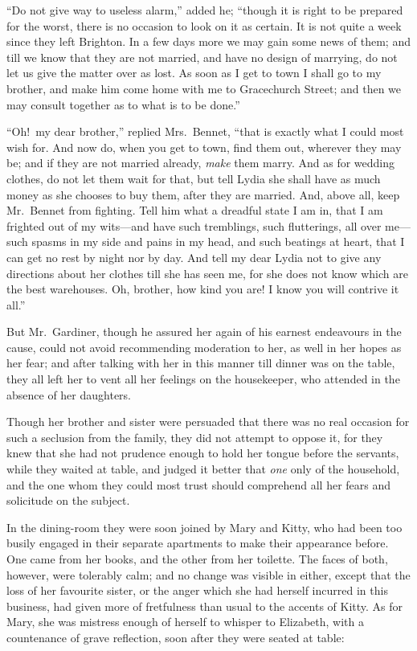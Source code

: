 \documentclass[12pt,english]{book}
\begin{document}
{}``Do not give way to useless alarm,'' added he; {}``though it
is right to be prepared for the worst, there is no occasion to look
on it as certain. It is not quite a week since they left Brighton.
In a few days more we may gain some news of them; and till we know
that they are not married, and have no design of marrying, do not
let us give the matter over as lost. As soon as I get to town I shall
go to my brother, and make him come home with me to Gracechurch Street;
and then we may consult together as to what is to be done.''

{}``Oh!\ my dear brother,'' replied Mrs.\ Bennet, {}``that is
exactly what I could most wish for. And now do, when you get to town,
find them out, wherever they may be; and if they are not married already,
\textit{make} them marry. And as for wedding clothes, do not let them
wait for that, but tell Lydia she shall have as much money as she
chooses to buy them, after they are married. And, above all, keep
Mr.\ Bennet from fighting. Tell him what a dreadful state I am in,
that I am frighted out of my wits\mbox{---}and have such tremblings,
such flutterings, all over me\mbox{---}such spasms in my side and
pains in my head, and such beatings at heart, that I can get no rest
by night nor by day. And tell my dear Lydia not to give any directions
about her clothes till she has seen me, for she does not know which
are the best warehouses. Oh, brother, how kind you are! I know you
will contrive it all.''

But Mr.\ Gardiner, though he assured her again of his earnest endeavours
in the cause, could not avoid recommending moderation to her, as well
in her hopes as her fear; and after talking with her in this manner
till dinner was on the table, they all left her to vent all her feelings
on the housekeeper, who attended in the absence of her daughters.

Though her brother and sister were persuaded that there was no real
occasion for such a seclusion from the family, they did not attempt
to oppose it, for they knew that she had not prudence enough to hold
her tongue before the servants, while they waited at table, and judged
it better that \textit{one} only of the household, and the one whom
they could most trust should comprehend all her fears and solicitude
on the subject.

In the dining-room they were soon joined by Mary and Kitty, who had
been too busily engaged in their separate apartments to make their
appearance before. One came from her books, and the other from her
toilette. The faces of both, however, were tolerably calm; and no
change was visible in either, except that the loss of her favourite
sister, or the anger which she had herself incurred in this business,
had given more of fretfulness than usual to the accents of Kitty.
As for Mary, she was mistress enough of herself to whisper to Elizabeth,
with a countenance of grave reflection, soon after they were seated
at table:
\end{document}
